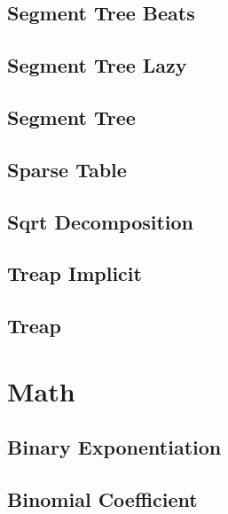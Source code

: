 \subsection{Segment Tree Beats}
\raggedbottom
\hrulefill
\subsection{Segment Tree Lazy}
\raggedbottom
\hrulefill
\subsection{Segment Tree}
\raggedbottom
\hrulefill
\subsection{Sparse Table}
\raggedbottom
\hrulefill
\subsection{Sqrt Decomposition}
\raggedbottom
\hrulefill
\subsection{Treap Implicit}
\raggedbottom
\hrulefill
\subsection{Treap}
\raggedbottom
\hrulefill

\section{Math}
\subsection{Binary Exponentiation}
\raggedbottom
\hrulefill
\subsection{Binomial Coefficient}
\raggedbottom
\hrulefill
